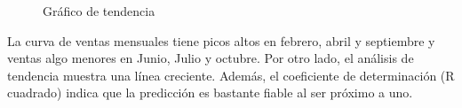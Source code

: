 \documentclass{article}
\theoremstyle{mytheoremstyle}
\theoremstyle{mytheoremstyle}
\theoremstyle{myproblemstyle}
\begin{document}
\begin{enumerate}
\begin{figure}[H]
	\caption[short]{Gráfico de tendencia}
	\label{fig:imagen2}
  \end{figure}
  La curva de ventas mensuales tiene picos altos en febrero, abril y septiembre y ventas algo menores en Junio, Julio y octubre. Por otro lado, el análisis de tendencia muestra una línea creciente. Además, el coeficiente de determinación (R cuadrado) indica que la predicción es bastante fiable al ser próximo a uno.
  \newpage
  
\nocite{*}

\end{enumerate}
\end{document}
